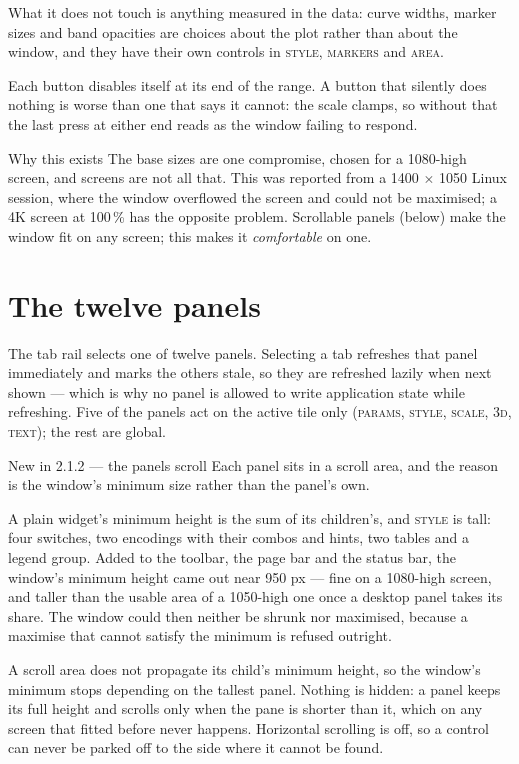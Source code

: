 \documentclass[11pt,a4paper,oneside]{report}
\newcommand{\appver}{2.1.2}
\newcommand{\tab}[1]{\textsc{#1}}
\begin{document}
What it does not touch is anything measured in the data: curve widths, marker
sizes and band opacities are choices about the plot rather than about the
window, and they have their own controls in \tab{style}, \tab{markers} and
\tab{area}.

Each button disables itself at its end of the range. A button that silently
does nothing is worse than one that says it cannot: the scale clamps, so
without that the last press at either end reads as the window failing to
respond.

\begin{aoenote}{Why this exists}
The base sizes are one compromise, chosen for a 1080-high screen, and screens
are not all that. This was reported from a 1400 $\times$ 1050 Linux session,
where the window overflowed the screen and could not be maximised; a 4K screen
at 100\,\% has the opposite problem. Scrollable panels (below) make the window
fit on any screen; this makes it \emph{comfortable} on one.
\end{aoenote}

\chapter{The twelve panels}

The tab rail selects one of twelve panels. Selecting a tab refreshes that panel
immediately and marks the others stale, so they are refreshed lazily when next
shown --- which is why no panel is allowed to write application state while
refreshing. Five of the panels act on the active tile only (\tab{params},
\tab{style}, \tab{scale}, \tab{3d}, \tab{text}); the rest are global.

\begin{aoenew}{New in \appver{} --- the panels scroll}
Each panel sits in a scroll area, and the reason is the window's minimum size
rather than the panel's own.

A plain widget's minimum height is the sum of its children's, and \tab{style}
is tall: four switches, two encodings with their combos and hints, two tables
and a legend group. Added to the toolbar, the page bar and the status bar, the
window's minimum height came out near 950 px --- fine on a 1080-high screen,
and taller than the usable area of a 1050-high one once a desktop panel takes
its share. The window could then neither be shrunk nor maximised, because a
maximise that cannot satisfy the minimum is refused outright.

A scroll area does not propagate its child's minimum height, so the window's
minimum stops depending on the tallest panel. Nothing is hidden: a panel keeps
its full height and scrolls only when the pane is shorter than it, which on any
screen that fitted before never happens. Horizontal scrolling is off, so a
control can never be parked off to the side where it cannot be found.
\end{aoenew}
\end{document}
